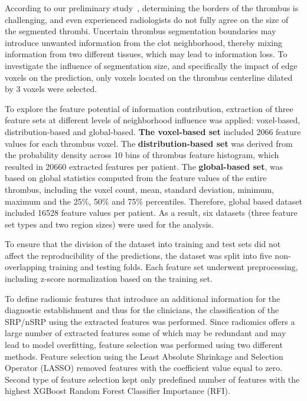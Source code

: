 \documentclass[preprint,12pt]{elsarticle}
\begin{document}
According to our preliminary study~\cite{Nemcekova2024}, determining the borders of the thrombus is challenging, and even experienced radiologists do not fully agree on the size of the segmented thrombi. Uncertain thrombus segmentation boundaries may introduce unwanted information from the clot neighborhood, thereby mixing information from two different tissues, which may lead to information loss. To investigate the influence of segmentation size, and specifically the impact of edge voxels on the prediction, only voxels located on the thrombus centerline dilated by 3 voxels were selected. 

To explore the feature potential of information contribution, extraction of three feature sets at different levels of neighborhood influence was applied: voxel-based, distribution-based and global-based. \textbf{The voxel-based set} included 2066 feature values for each thrombus voxel. The \textbf{distribution-based set} was derived from the probability density across 10 bins of thrombus feature histogram, which resulted in 20660 extracted features per patient. The \textbf{global-based set}, was based on global statistics computed from the feature values of the entire thrombus, including the voxel count, mean, standard deviation, minimum, maximum and the 25\%, 50\% and 75\% percentiles. Therefore, global based dataset included 16528 feature values per patient. As a result, six datasets (three feature set types and two region sizes) were used for the analysis.

To ensure that the division of the dataset into training and test sets did not affect the reproducibility of the predictions, the dataset was split into five non-overlapping training and testing folds. Each feature set underwent preprocessing, including z-score normalization based on the training set.

To define radiomic features that introduce an additional information for the diagnostic establishment and thus for the clinicians, the classification of the SRP/nSRP using the extracted features was performed. Since radiomics offers a large number of extracted features some of which may be redundant and may lead to model overfitting, feature selection was performed using two different methods. Feature selection using the Least Absolute Shrinkage and Selection Operator (LASSO) removed features with the coefficient value equal to zero. Second type of feature selection kept only predefined number of features with the highest XGBoost Random Forest Classifier Importance (RFI).
\end{document}
